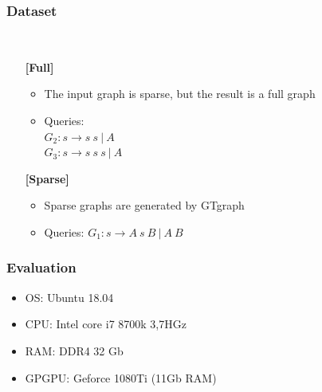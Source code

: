 \documentclass[xcolor=table]{beamer}
\begin{document}
\begin{frame}[fragile] \frametitle{Dataset}
  \begin{minipage}[t]{1cm}
\hspace{1cm}
  \end{minipage}
  ~
\begin{minipage}[t]{0.85\textwidth}
\begin{itemize}
\item[\textbf{[Full]}]
\begin{itemize}
  \item The input graph is sparse, but the result is a full graph
  \item Queries: \\ $G_2: s \to s \ s \ | \ A$ \\ $G_3: s \to s \ s \ s \ | \ A$
\end{itemize}
\pause
\item[\textbf{[Sparse]}]
\begin{itemize}
  \item Sparse graphs are generated by GTgraph
  \item Queries: $G_1: s \to A \ s \ B \ | \ A \ B$
\end{itemize}
\end{itemize}
\end{minipage}
\end{frame}

\begin{frame} \frametitle{Evaluation}
  \begin{itemize}
   \item OS: Ubuntu 18.04
   \item CPU: Intel core i7 8700k 3,7HGz
   \item RAM: DDR4 32 Gb
   \item GPGPU: Geforce 1080Ti (11Gb RAM)
  \end{itemize}
\end{frame}
\end{document}
